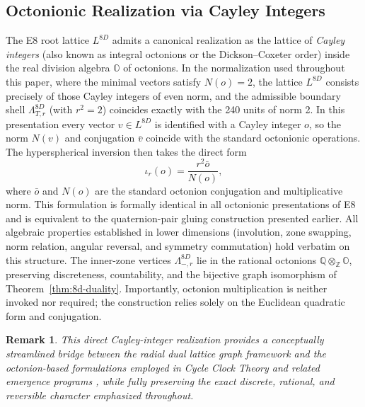 \documentclass{article}
\newtheorem{remark}{Remark}
\begin{document}
\subsection{Octonionic Realization via Cayley Integers}
The E8 root lattice \(L^{8D}\) admits a canonical realization as the lattice of \emph{Cayley integers} (also known as integral octonions or the Dickson--Coxeter order) inside the real division algebra \(\mathbb{O}\) of octonions. In the normalization used throughout this paper, where the minimal vectors satisfy \(N(o) = 2\), the lattice \(L^{8D}\) consists precisely of those Cayley integers of even norm, and the admissible boundary shell \(\Lambda_{T,r}^{8D}\) (with \(r^2 = 2\)) coincides exactly with the 240 units of norm 2.
In this presentation every vector \(v \in L^{8D}\) is identified with a Cayley integer \(o\), so the norm \(N(v)\) and conjugation \(\bar{v}\) coincide with the standard octonionic operations. The hyperspherical inversion then takes the direct form
\[
\iota_r(o) = \frac{r^2 \bar{o}}{N(o)},
\]
where \(\bar{o}\) and \(N(o)\) are the standard octonion conjugation and multiplicative norm. This formulation is formally identical in all octonionic presentations of E8 and is equivalent to the quaternion-pair gluing construction presented earlier.
All algebraic properties established in lower dimensions (involution, zone swapping, norm relation, angular reversal, and symmetry commutation) hold verbatim on this structure. The inner-zone vertices \(\Lambda_{-,r}^{8D}\) lie in the rational octonions \(\mathbb{Q}\otimes_{\mathbb{Z}}\mathbb{O}\), preserving discreteness, countability, and the bijective graph isomorphism of Theorem~\ref{thm:8d-duality}. Importantly, octonion multiplication is neither invoked nor required; the construction relies solely on the Euclidean quadratic form and conjugation.
\begin{remark}
This direct Cayley-integer realization provides a conceptually streamlined bridge between the radial dual lattice graph framework and the octonion-based formulations employed in Cycle Clock Theory and related emergence programs \cite{Dixon1994,Furey2016}, while fully preserving the exact discrete, rational, and reversible character emphasized throughout.
\end{remark}
\end{document}
